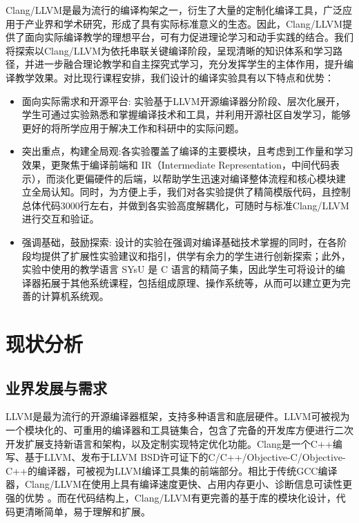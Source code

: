 \documentclass{SCIS2020cn}
\begin{document}
Clang/LLVM是最为流行的编译构架之一，衍生了大量的定制化编译工具，广泛应用于产业界和学术研究，形成了具有实际标准意义的生态。因此，Clang/LLVM提供了面向实际编译教学的理想平台，可有力促进理论学习和动手实践的结合。我们将探索以Clang/LLVM为依托串联关键编译阶段，呈现清晰的知识体系和学习路径，并进一步融合理论教学和自主探究式学习，充分发挥学生的主体作用，提升编译教学效果。对比现行课程安排，我们设计的编译实验具有以下特点和优势：
\begin{itemize}
    \item 面向实际需求和开源平台: 实验基于LLVM开源编译器分阶段、层次化展开，学生可通过实验熟悉和掌握编译技术和工具，并利用开源社区自发学习，能够更好的将所学应用于解决工作和科研中的实际问题。
    \item 突出重点，构建全局观:各实验覆盖了编译的主要模块，且考虑到工作量和学习效果，更聚焦于编译前端和 IR（Intermediate Representation，中间代码表示），而淡化更偏硬件的后端，以帮助学生迅速对编译整体流程和核心模块建立全局认知。同时，为方便上手，我们对各实验提供了精简模版代码，且控制总体代码3000行左右，并做到各实验高度解耦化，可随时与标准Clang/LLVM进行交互和验证。
    \item 强调基础，鼓励探索: 设计的实验在强调对编译基础技术掌握的同时，在各阶段均提供了扩展性实验建议和指引，供学有余力的学生进行创新探索；此外，实验中使用的教学语言 SYsU 是 C 语言的精简子集，因此学生可将设计的编译器拓展于其他系统课程，包括组成原理、操作系统等，从而可以建立更为完善的计算机系统观。
\end{itemize}

\section{现状分析}

\subsection{业界发展与需求}
\label{sec_situation}

LLVM是最为流行的开源编译器框架，支持多种语言和底层硬件。LLVM可被视为一个模块化的、可重用的编译器和工具链集合，包含了完备的开发库方便进行二次开发扩展支持新语言和架构，以及定制实现特定优化功能。Clang是一个C++编写、基于LLVM、发布于LLVM BSD许可证下的C/C++/Objective-C/Objective-C++的编译器，可被视为LLVM编译工具集的前端部分。相比于传统GCC编译器，Clang/LLVM在使用上具有编译速度更快、占用内存更小、诊断信息可读性更强的优势 \cite{web_llvm}。而在代码结构上，Clang/LLVM有更完善的基于库的模块化设计，代码更清晰简单，易于理解和扩展。
\end{document}
